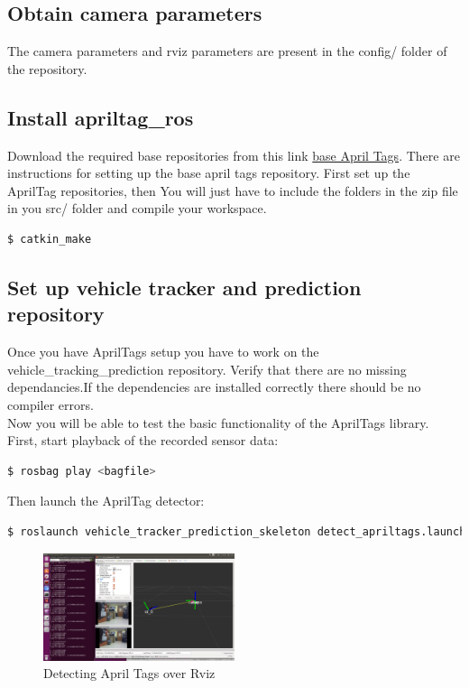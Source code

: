 \documentclass[letta4 paper]{article}
\begin{document}
\subsection{Obtain camera parameters}
The camera parameters and rviz parameters are present in the config/ folder of the repository.

\subsection{Install apriltag\_ros}
Download the required base repositories from this link \href{https://github.com/AprilRobotics/apriltag}{base April Tags}. There are instructions for setting up the base april tags repository. 
First set up the AprilTag repositories, then You will just have to include the folders in the zip file in you src/ folder and compile your workspace. 

\begin{lstlisting}[language=bash]
  $ catkin_make
\end{lstlisting}


\subsection{Set up vehicle tracker and prediction repository}
Once you have AprilTags setup you have to work on the vehicle\_tracking\_prediction repository. Verify that there are no missing dependancies.If the dependencies are installed correctly there should be no compiler errors.\\
Now you will be able to test the basic functionality of the AprilTags library. First, start playback of the recorded sensor data:
\begin{lstlisting}[language=bash]
  $ rosbag play <bagfile>
\end{lstlisting}
Then launch the AprilTag detector:
\begin{lstlisting}[language=bash]
  $ roslaunch vehicle_tracker_prediction_skeleton detect_apriltags.launch
\end{lstlisting}

\begin{figure}
  \centering
    \includegraphics[width=0.5\textwidth]{detect-apriltag-launch.png}
   \caption{Detecting April Tags over Rviz}
\end{figure}
\end{document}
